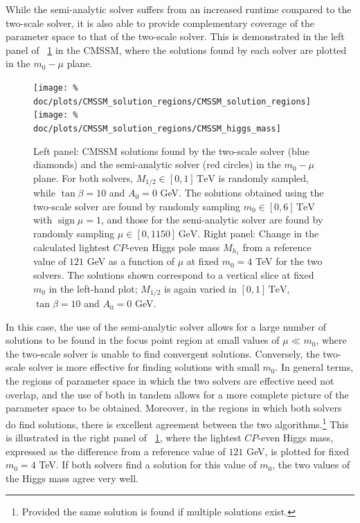 \documentclass[final,3p,11pt,pdflatex]{elsarticle}
\newcommand{\unit}[1]{\,\text{#1}}      %
\newcommand{\figref}[1]{\figurename~\ref{#1}}
\newcommand{\CP}{\ensuremath{CP}\xspace}
\newcommand{\azero}{\ensuremath{A_0}\xspace}
\newcommand{\mhalf}{\ensuremath{M_{1/2}}\xspace}
\newcommand{\mzero}{\ensuremath{m_0}\xspace}
\DeclareMathOperator{\sign}{sign}
\begin{document}
While the semi-analytic solver suffers from an increased runtime compared to
the two-scale solver, it is also able to provide complementary coverage of the
parameter space to that of the two-scale solver.  This is demonstrated in the left panel of
\figref{fig:cmssm_solution_regions} in the CMSSM, where the solutions found
by each solver are plotted in the $\mzero - \mu$ plane.
%
\begin{figure}
  \centering
  \texttt{[image: \%
    doc/plots/CMSSM\_solution\_regions/CMSSM\_solution\_regions]}
  \texttt{[image: \%
    doc/plots/CMSSM\_solution\_regions/CMSSM\_higgs\_mass]}
  \caption{Left panel: CMSSM solutions found by the two-scale solver (blue diamonds)
    and the semi-analytic solver (red circles) in the $\mzero - \mu$ plane.
    For both solvers, $\mhalf \in [0,1]\unit{TeV}$ is randomly sampled,
    while $\tan\beta = 10$ and $\azero = 0$ GeV\@.  The solutions obtained
    using the two-scale solver are found by randomly sampling
    $\mzero \in [0, 6]\unit{TeV}$ with $\sign \mu = 1$, and those for the
    semi-analytic solver are found by randomly sampling $\mu \in [0,1150]
    \unit{GeV}$.  Right panel: Change in the calculated lightest \CP-even
    Higgs pole mass $M_{h_1}$ from a reference value of $121$ GeV as a
    function of $\mu$ at fixed $\mzero = 4$ TeV for the two solvers.  The
    solutions shown correspond to a vertical slice at fixed $\mzero$ in the
    left-hand plot; $\mhalf$ is again varied in $[0,1]\unit{TeV}$,
    $\tan\beta = 10$ and $\azero = 0$ GeV.}
  \label{fig:cmssm_solution_regions}
\end{figure}
%
In this case, the use of the semi-analytic solver allows for a large number
of solutions to be found in the focus point region \cite{Chan:1997bi,
  Feng:1999hg,Feng:1999mn} at small values of $\mu \ll \mzero$, where the
two-scale solver is unable to find convergent solutions.  Conversely,
the two-scale solver is more effective for finding solutions with small
$\mzero$.  In general terms, the regions of parameter space in which the two
solvers are effective need not overlap, and the use of both in tandem allows
for a more complete picture of the parameter space to be obtained.  Moreover,
in the regions in which both solvers do find solutions, there is excellent
agreement between the two algorithms.\footnote{Provided the same solution is
  found if multiple solutions exist.}  This is illustrated in the right
panel of \figref{fig:cmssm_solution_regions}, where the lightest \CP-even
Higgs mass, expressed as the difference from a reference value of $121$ GeV,
is plotted for fixed $\mzero = 4$ TeV\@.  If both solvers find a solution for
this value of $\mzero$, the two values of the Higgs mass agree very well.
\end{document}
